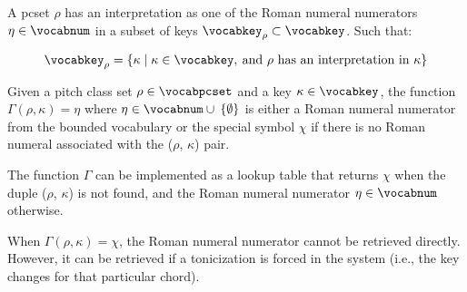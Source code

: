 
A \gls{pcset} $\rho$ has an interpretation as one of the
Roman numeral numerators $\eta \in \vocabnum$ in a subset of
keys $\vocabkey_{\rho} \subset \vocabkey$. Such that:

\begin{equation}
    \vocabkey_{\rho} = \{\kappa \mid \kappa \in \vocabkey,
     \: \text{and $\rho$ has an interpretation in $\kappa$}\}
\end{equation}

Given a pitch class set $\rho \in \vocabpcset$ and a key
$\kappa \in \vocabkey$, the function $\Gamma(\rho, \kappa) =
\eta$ where $\eta \in \vocabnum \cup \: \{ \emptyset \}$ is
either a Roman numeral numerator from the bounded vocabulary
or the special symbol $\chi$ if there is no Roman numeral
associated with the ($\rho$, $\kappa$) pair.

The function $\Gamma$ can be implemented as a lookup table
that returns $\chi$ when the duple ($\rho$, $\kappa$) is not
found, and the Roman numeral numerator $\eta \in \vocabnum$
otherwise.

When $\Gamma(\rho, \kappa) = \chi$, the Roman numeral
numerator cannot be retrieved directly. However, it can be
retrieved if a tonicization is forced in the system (i.e.,
the key changes for that particular chord).

